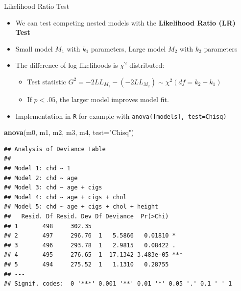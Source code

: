 \documentclass[
  ignorenonframetext,
]{beamer}
\newenvironment{Shaded}{\begin{snugshade}}{\end{snugshade}}
\newcommand{\DataTypeTok}[1]{\textcolor[rgb]{0.13,0.29,0.53}{#1}}
\newcommand{\KeywordTok}[1]{\textcolor[rgb]{0.13,0.29,0.53}{\textbf{#1}}}
\newcommand{\NormalTok}[1]{#1}
\newcommand{\StringTok}[1]{\textcolor[rgb]{0.31,0.60,0.02}{#1}}
\providecommand{\tightlist}{%
  \setlength{\itemsep}{0pt}\setlength{\parskip}{0pt}}
\begin{document}
\begin{frame}[fragile]{Likelihood Ratio Test}
\protect\hypertarget{likelihood-ratio-test}{}

\begin{itemize}
\tightlist
\item
  We can test competing nested models with the \textbf{Likelihood Ratio
  (LR) Test}
\item
  Small model \(M_1\) with \(k_1\) parameters, Large model \(M_2\) with
  \(k_2\) parameters
\item
  The difference of log-likelihoods is \(\chi^2\) distributed:

  \begin{itemize}
  \tightlist
  \item
    Test statistic
    \(G^2=-2LL_{M_1} - (-2LL_{M_2}) \sim \chi^2(df=k_2-k_1)\)
  \item
    If \(p<.05\), the larger model improves model fit.
  \end{itemize}
\item
  Implementation in \texttt{R} for example with
  \texttt{anova({[}models{]},\ test=\textquotesingle{}Chisq\textquotesingle{})}
\end{itemize}

\end{frame}

\begin{frame}[fragile]

\tiny

\begin{Shaded}
\begin{Highlighting}[]
\KeywordTok{anova}\NormalTok{(m0, m1, m2, m3, m4, }\DataTypeTok{test=}\StringTok{"Chisq"}\NormalTok{)}
\end{Highlighting}
\end{Shaded}

\begin{verbatim}
## Analysis of Deviance Table
## 
## Model 1: chd ~ 1
## Model 2: chd ~ age
## Model 3: chd ~ age + cigs
## Model 4: chd ~ age + cigs + chol
## Model 5: chd ~ age + cigs + chol + height
##   Resid. Df Resid. Dev Df Deviance  Pr(>Chi)    
## 1       498     302.35                          
## 2       497     296.76  1   5.5866   0.01810 *  
## 3       496     293.78  1   2.9815   0.08422 .  
## 4       495     276.65  1  17.1342 3.483e-05 ***
## 5       494     275.52  1   1.1310   0.28755    
## ---
## Signif. codes:  0 '***' 0.001 '**' 0.01 '*' 0.05 '.' 0.1 ' ' 1
\end{verbatim}

\normalsize

\end{frame}
\end{document}
